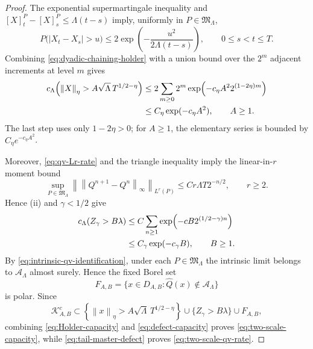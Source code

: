 \documentclass[11pt,reqno]{amsart}
\theoremstyle{plain}
\theoremstyle{definition}
\newcommand{\cK}{\mathcal K}
\newcommand{\norm}[1]{\left\lVert #1\right\rVert}
\newcommand{\abs}[1]{\left\lvert #1\right\rvert}
\begin{document}
\begin{proof}
The exponential supermartingale inequality and
\([X]^P_t-[X]^P_s\le\Lambda(t-s)\) imply, uniformly in
\(P\in\mathfrak M_\Lambda\),
\begin{equation}\label{eq:martingale-increment-gaussian}
  P\bigl(\abs{X_t-X_s}>u\bigr)
  \le2\exp\!\left(-\frac{u^2}{2\Lambda(t-s)}\right),
  \qquad 0\le s<t\le T.
\end{equation}
Combining \eqref{eq:dyadic-chaining-holder} with a union bound over the
\(2^m\) adjacent increments at level \(m\) gives
\begin{align}
  c_\Lambda\!\left(
    \norm{X}_\eta>A\sqrt\Lambda\,T^{1/2-\eta}
  \right)
  &\le
  2\sum_{m\ge0}2^m
  \exp\!\left(
    -c_\eta A^2 2^{(1-2\eta)m}
  \right) \notag\\
  &\le C_\eta\exp(-c_\eta A^2),
  \qquad A\ge1.
  \label{eq:Holder-capacity}
\end{align}
The last step uses only \(1-2\eta>0\); for \(A\ge1\), the elementary
series is bounded by \(C_\eta e^{-c_\eta A^2}\).

Moreover, \eqref{eq:qv-Lr-rate} and the triangle inequality imply the
linear-in-\(r\) moment bound
\[
  \sup_{P\in\mathfrak M_\Lambda}
  \left\|
    \norm{Q^{n+1}-Q^n}_\infty
  \right\|_{L^r(P)}
  \le Cr\Lambda T2^{-n/2},
  \qquad r\ge2.
\]
Hence (ii) and \(\gamma<1/2\) give
\begin{align}
  c_\Lambda(Z_\gamma>B\lambda)
  &\le
  C\sum_{n\ge1}
  \exp\!\left(
    -cB 2^{(1/2-\gamma)n}
  \right) \notag\\
  &\le C_\gamma\exp(-c_\gamma B),
  \qquad B\ge1.
  \label{eq:defect-capacity}
\end{align}
By \eqref{eq:intrinsic-qv-identification}, under each
\(P\in\mathfrak M_\Lambda\) the intrinsic
limit belongs to \(\mathcal A_\Lambda\) almost surely.  Hence the fixed Borel
set
\[
  F_{A,B}
  =\{x\in D_{A,B}:\widehat Q(x)\notin\mathcal A_\Lambda\}
\]
is polar.  Since
\[
  \cK_{A,B}^c
  \subset
  \left\{\norm{x}_\eta>
    A\sqrt\Lambda\,T^{1/2-\eta}\right\}
  \cup\{Z_\gamma>B\lambda\}\cup F_{A,B},
\]
combining
\eqref{eq:Holder-capacity} and \eqref{eq:defect-capacity} proves
\eqref{eq:two-scale-capacity}, while
\eqref{eq:tail-master-defect} proves
\eqref{eq:two-scale-qv-rate}.


\end{proof}
\end{document}
